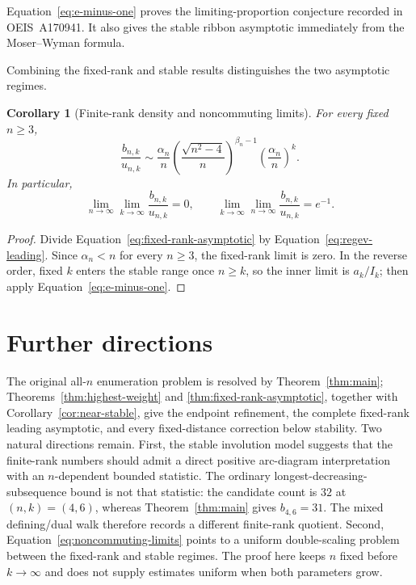 \documentclass[11pt]{article}
\newtheorem{corollary}[theorem]{Corollary}
\theoremstyle{definition}
\begin{document}
Equation~\eqref{eq:e-minus-one} proves the limiting-proportion conjecture
recorded in OEIS~A170941.  It also gives the stable ribbon asymptotic
immediately from the Moser--Wyman formula.

Combining the fixed-rank and stable results distinguishes the two asymptotic
regimes.

\begin{corollary}[Finite-rank density and noncommuting limits]
For every fixed $n\ge3$,
\begin{equation}\label{eq:fixed-rank-density}
 \frac{b_{n,k}}{u_{n,k}}\sim
 \frac{\alpha_n}{n}
 \left(\frac{\sqrt{n^2-4}}n\right)^{\beta_n-1}
 \left(\frac{\alpha_n}{n}\right)^k.
\end{equation}
In particular,
\begin{equation}\label{eq:noncommuting-limits}
 \lim_{n\to\infty}\lim_{k\to\infty}\frac{b_{n,k}}{u_{n,k}}=0,
 \qquad
 \lim_{k\to\infty}\lim_{n\to\infty}\frac{b_{n,k}}{u_{n,k}}=e^{-1}.
\end{equation}
\end{corollary}

\begin{proof}
Divide Equation~\eqref{eq:fixed-rank-asymptotic} by
Equation~\eqref{eq:regev-leading}.  Since $\alpha_n<n$ for every $n\ge3$,
the fixed-rank limit is zero.  In the reverse order, fixed $k$ enters the
stable range once $n\ge k$, so the inner limit is $a_k/I_k$; then apply
Equation~\eqref{eq:e-minus-one}.
\end{proof}

\section{Further directions}

The original all-$n$ enumeration problem is resolved by
Theorem~\ref{thm:main}; Theorems~\ref{thm:highest-weight} and
\ref{thm:fixed-rank-asymptotic}, together with
Corollary~\ref{cor:near-stable}, give the endpoint refinement, the complete
fixed-rank leading asymptotic, and every fixed-distance correction below
stability.  Two natural directions remain.  First, the stable
involution model suggests that the finite-rank
numbers should admit a direct positive arc-diagram interpretation with an
$n$-dependent bounded statistic.  The ordinary
longest-decreasing-subsequence bound is not that statistic: the candidate
count is $32$ at $(n,k)=(4,6)$, whereas Theorem~\ref{thm:main} gives
$b_{4,6}=31$.  The mixed defining/dual walk therefore records a different
finite-rank quotient.  Second,
Equation~\eqref{eq:noncommuting-limits} points to a uniform double-scaling
problem between the fixed-rank and stable regimes.  The proof here keeps $n$
fixed before $k\to\infty$ and does not supply estimates uniform when both
parameters grow.
\end{document}
